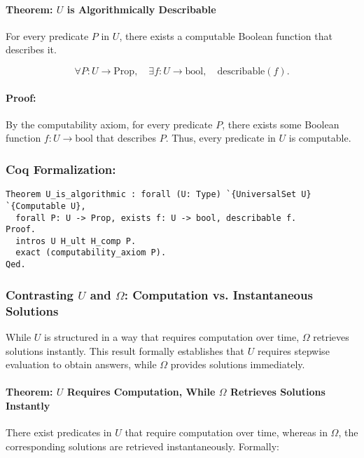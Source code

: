 \documentclass[12pt]{article}
\begin{document}
\paragraph{Theorem: \( U \) is Algorithmically Describable}
For every predicate \( P \) in \( U \), there exists a computable Boolean function that describes it.

\begin{equation}
    \forall P: U \to \text{Prop}, \quad \exists f: U \to \text{bool}, \quad \text{describable}(f).
\end{equation}

\paragraph{Proof:}
By the computability axiom, for every predicate \( P \), there exists some Boolean function \( f: U \to \text{bool} \) that describes \( P \). Thus, every predicate in \( U \) is computable.

\subsubsection{Coq Formalization:}
\begin{lstlisting}[language=Coq]
Theorem U_is_algorithmic : forall (U: Type) `{UniversalSet U} `{Computable U},
  forall P: U -> Prop, exists f: U -> bool, describable f.
Proof.
  intros U H_ult H_comp P.
  exact (computability_axiom P).
Qed.
\end{lstlisting}

\subsubsection{Contrasting \( U \) and \( \Omega \): Computation vs. Instantaneous Solutions}

While \( U \) is structured in a way that requires computation over time, \( \Omega \) retrieves solutions instantly. This result formally establishes that \( U \) requires stepwise evaluation to obtain answers, while \( \Omega \) provides solutions immediately.

\paragraph{Theorem: \( U \) Requires Computation, While \( \Omega \) Retrieves Solutions Instantly}
There exist predicates in \( U \) that require computation over time, whereas in \( \Omega \), the corresponding solutions are retrieved instantaneously. Formally:
\end{document}
